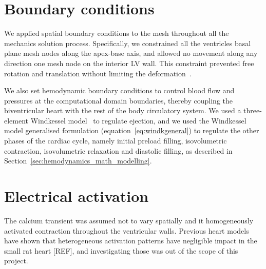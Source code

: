 %
%
%
\section{Boundary conditions}
We applied spatial boundary conditions to the mesh throughout all the mechanics solution process. Specifically, we constrained all the ventricles basal plane mesh nodes along the apex-base axis, and allowed no movement along any direction one mesh node on the interior LV wall. This constraint prevented free rotation and translation without limiting the deformation~\cite{Land:2012}.

\vspace{0.2cm}
We also set hemodynamic boundary conditions to control blood flow and pressures at the computational domain boundaries, thereby coupling the biventricular heart with the rest of the body circulatory system. We used a three-element Windkessel model~\cite{Westerhof:1971} to regulate ejection, and we used the Windkessel model generalised formulation (equation~\eqref{eq:windkgeneral}) to regulate the other phases of the cardiac cycle, namely initial preload filling, isovolumetric contraction, isovolumetric relaxation and diastolic filling, as described in Section~\ref{sec:hemodynamics_math_modelling}.


%
%
%
\section{Electrical activation}
The calcium transient was assumed not to vary spatially and it homogeneously activated contraction throughout the ventricular walls. Previous heart models
have shown that heterogeneous activation patterns have negligible impact in the small rat heart [REF], and investigating those was out of the scope of this project.
